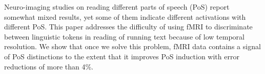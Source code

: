 Neuro-imaging studies on reading different parts of speech (PoS) report somewhat mixed results, yet some of them indicate different activations with different PoS. This paper addresses the difficulty of using fMRI to discriminate between linguistic tokens in reading of running text because of low temporal resolution. We show that once we solve this problem, fMRI data contains a signal of PoS distinctions to the extent that it improves PoS induction with error reductions of more than 4\%.
